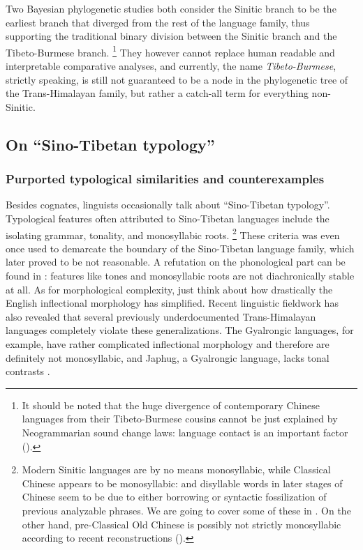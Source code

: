 \documentclass[UTF8, a4paper, oneside, scheme=plain, 12pt]{ctexrep}
\newcommand*{\term}[1]{\emph{#1}}
\begin{document}
Two Bayesian phylogenetic studies \citep{sagart2019dated,zhang2019phylogenetic} 
both consider the Sinitic branch to be the earliest branch that diverged from the rest of the language family,
thus supporting the traditional binary division between the Sinitic branch
and the Tibeto-Burmese branch.%
\footnote{
    It should be noted that the huge divergence of contemporary Chinese languages
    from their Tibeto-Burmese cousins 
    cannot be just explained by Neogrammarian sound change laws:
    language contact is an important factor ().
}
They however cannot replace human readable and interpretable comparative analyses,
and currently, the name \term{Tibeto-Burmese}, strictly speaking,
is still not guaranteed to be a node in the phylogenetic tree of the Trans-Himalayan family,
but rather a catch-all term for everything non-Sinitic.

\subsection{On ``Sino-Tibetan typology''}\label{sec:intro.sino-tibetan-typology}

\subsubsection{Purported typological similarities and counterexamples}
Besides cognates, linguists occasionally talk about ``Sino-Tibetan typology''.
Typological features often attributed to Sino-Tibetan languages include the isolating grammar,
tonality, and monosyllabic roots.%
\footnote{
    Modern Sinitic languages are by no means monosyllabic,
    while Classical Chinese appears to be monosyllabic:
    and disyllable words in later stages of Chinese seem to be due to 
    either borrowing or syntactic fossilization of previous analyzable phrases.
    We are going to cover some of these in .
    On the other hand, pre-Classical Old Chinese is possibly not strictly monosyllabic
    according to recent reconstructions ().
}
These criteria was even once used to demarcate the boundary of the Sino-Tibetan language family,
which later proved to be not reasonable.
A refutation on the phonological part can be found in \citet{matisoff1973notes}:
features like tones and monosyllabic roots are not diachronically stable at all. 
As for morphological complexity, just think about how drastically the English inflectional morphology has simplified.
Recent linguistic fieldwork has also revealed that several previously underdocumented Trans-Himalayan languages
completely violate these generalizations.
The Gyalrongic languages, for example, have rather complicated inflectional morphology
and therefore are definitely not monosyllabic,
and Japhug, a Gyalrongic language, lacks tonal contrasts \citep{jacques2021grammar}.
\end{document}
